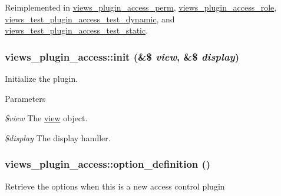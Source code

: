Reimplemented in \hyperlink{classviews__plugin__access__perm_ac9dce994826265f48711a23cf3f2414f}{views\_\-plugin\_\-access\_\-perm}, \hyperlink{classviews__plugin__access__role_a50094384e297acdd629d9462004df69a}{views\_\-plugin\_\-access\_\-role}, \hyperlink{classviews__test__plugin__access__test__dynamic_ac4efa2ff862eb1592afd64b76ebfed1d}{views\_\-test\_\-plugin\_\-access\_\-test\_\-dynamic}, and \hyperlink{classviews__test__plugin__access__test__static_a4ddfff64a5cccae83c64e4c89095aeb6}{views\_\-test\_\-plugin\_\-access\_\-test\_\-static}.\hypertarget{classviews__plugin__access_a1b295cea820f403d1e361e7de4e3800e}{
\subsubsection[{init}]{\setlength{\rightskip}{0pt plus 5cm}views\_\-plugin\_\-access::init (\&\$ {\em view}, \/  \&\$ {\em display})}}
\label{classviews__plugin__access_a1b295cea820f403d1e361e7de4e3800e}
Initialize the plugin.


\begin{DoxyParams}{Parameters}
\item[{\em \$view}]The \hyperlink{classview}{view} object. \item[{\em \$display}]The display handler. \end{DoxyParams}
\hypertarget{classviews__plugin__access_a3d52dc2603a2991a46a3c212a04097d2}{
\subsubsection[{option\_\-definition}]{\setlength{\rightskip}{0pt plus 5cm}views\_\-plugin\_\-access::option\_\-definition ()}}
\label{classviews__plugin__access_a3d52dc2603a2991a46a3c212a04097d2}
Retrieve the options when this is a new access control plugin 

